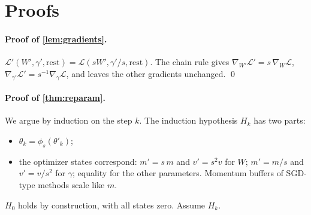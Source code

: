 \section{Proofs}\label{app:proofs}

\paragraph{Proof of \cref{lem:gradients}.} $\mathcal L'(W',\gamma',\mathrm{rest})=\mathcal L(sW',\gamma'/s,\mathrm{rest})$. The chain rule gives $\nabla_{W'}\mathcal L'=s\,\nabla_W\mathcal L$, $\nabla_{\gamma'}\mathcal L'=s^{-1}\nabla_\gamma\mathcal L$, and leaves the other gradients unchanged. \qed

\paragraph{Proof of \cref{thm:reparam}.} We argue by induction on the step $k$. The induction hypothesis $H_k$ has two parts:
\begin{itemize}[leftmargin=*,itemsep=1pt]
\item $\theta_k=\phi_s(\theta'_k)$;
\item the optimizer states correspond: $m'=s\,m$ and $v'=s^2v$ for $W$; $m'=m/s$ and $v'=v/s^2$ for $\gamma$; equality for the other parameters. Momentum buffers of SGD-type methods scale like $m$.
\end{itemize}
$H_0$ holds by construction, with all states zero. Assume $H_k$.
